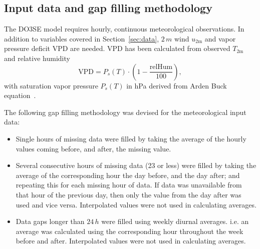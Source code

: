 \documentclass[bg, manuscript]{copernicus}
\begin{document}
\subsection{Input data and gap filling methodology}
\label{subsec:ozone_reco}
The DO3SE model requires hourly, continuous meteorological observations. In addition to variables covered in Section~\ref{sec:data}, $2\,\unit{m}$ wind $u_\text{2m}$ and vapor pressure deficit VPD are needed. VPD has been calculated from observed $T_\text{2m}$ and relative humidity
\begin{equation}
  \text{VPD} = P_s(T) \cdot \left(1-\frac{\text{relHum}}{100}\right),
\end{equation}
with saturation vapor pressure $P_s(T)$ in \unit{hPa} derived from Arden Buck equation~\citep{JAP:Buck1981, Buck2012}.
  
The following gap filling methodology was devised for the meteorological input data:
\begin{itemize}
\item Single hours of missing data were filled by taking the average of the hourly values coming before, and after, the missing value.
\item Several consecutive hours of missing data (23 or less) were filled by taking the average of the corresponding hour the day before, and the day after; and repeating this for each missing hour of data. If data was unavailable from that hour of the previous day, then only the value from the day after was used and vice versa. Interpolated values were not used in calculating averages.
\item Data gaps longer than $24\,\unit{h}$ were filled using weekly diurnal averages. i.e. an average was calculated using the corresponding hour throughout the week before and after. Interpolated values were not used in calculating averages.
\end{itemize}
\end{document}
